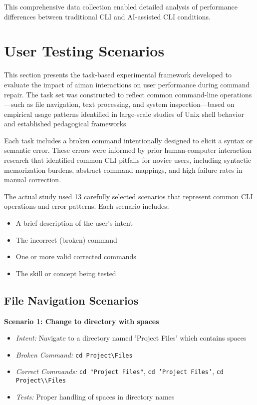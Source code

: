This comprehensive data collection enabled detailed analysis of performance differences between traditional CLI and AI-assisted CLI conditions.

\section{User Testing Scenarios}

This section presents the task-based experimental framework developed to evaluate the impact of aiman interactions on user performance during command repair. The task set was constructed to reflect common command-line operations—such as file navigation, text processing, and system inspection—based on empirical usage patterns identified in large-scale studies of Unix shell behavior and established pedagogical frameworks.

Each task includes a broken command intentionally designed to elicit a syntax or semantic error. These errors were informed by prior human-computer interaction research that identified common CLI pitfalls for novice users, including syntactic memorization burdens, abstract command mappings, and high failure rates in manual correction.

The actual study used 13 carefully selected scenarios that represent common CLI operations and error patterns. Each scenario includes:
\begin{itemize}
	\item A brief description of the user's intent
	\item The incorrect (broken) command
	\item One or more valid corrected commands
	\item The skill or concept being tested
\end{itemize}

\subsection{File Navigation Scenarios}

\textbf{Scenario 1: Change to directory with spaces}
\begin{itemize}
	\item \textit{Intent:} Navigate to a directory named 'Project Files' which contains spaces
	\item \textit{Broken Command:} \texttt{cd Project\textbackslash Files}
	\item \textit{Correct Commands:} \texttt{cd "Project Files"}, \texttt{cd 'Project Files'}, \texttt{cd Project\textbackslash\textbackslash Files}
	\item \textit{Tests:} Proper handling of spaces in directory names
\end{itemize}

